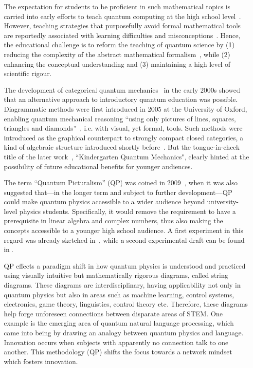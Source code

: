 The expectation for students to be proficient in such mathematical topics is carried into early efforts to teach quantum computing at the high school level~\cite{perry2019quantum}.
However, teaching strategies that purposefully avoid formal mathematical tools are reportedly associated with learning difficulties and misconceptions~\cite{krijtenburg2017insights}.
Hence, the educational challenge is to reform the teaching of quantum science by (1) reducing the complexity of the abstract mathematical formalism~\cite{bouchee2022towards}, while (2) enhancing the conceptual understanding and (3) maintaining a high level of scientific rigour.

The development of categorical quantum mechanics~\cite{abramsky2009categorical} in the early 2000s showed that an alternative approach to introductory quantum education was possible.
Diagrammatic methods were first introduced in 2005 at the University of Oxford, enabling quantum mechanical reasoning ``using only pictures of lines, squares, triangles and diamonds''~\cite{coecke2006kindergarten}, i.e. with visual, yet formal, tools.
Such methods were introduced as the graphical counterpart to strongly compact closed categories, a kind of algebraic structure introduced shortly before~\cite{abramsky2004categorical}.
But the tongue-in-cheek title of the later work~\cite{coecke2006kindergarten}, ``Kindergarten Quantum Mechanics", clearly hinted at the possibility of future educational benefits for younger audiences.

The term ``Quantum Picturalism'' (QP) was coined in 2009~\cite{ContPhys}, when it was also suggested that---in the longer term and subject to further development---QP could make quantum physics accessible to a wider audience beyond university-level physics students. Specifically, it would remove the requirement to have a prerequisite in linear algebra and complex numbers, thus also making the concepts accessible to a younger high school audience. 
A first experiment in this regard was already sketched in~\cite[\S6]{ContPhys}, while a second experimental draft can be found in \cite{exp1}.



QP effects a paradigm shift in how quantum physics is understood and practiced using visually intuitive but mathematically rigorous diagrams, called string diagrams. These diagrams are interdisciplinary, having applicability not only in quantum physics but also in areas such as machine learning, control systems, electronics, game theory, linguistics, control theory etc. Therefore, these diagrams help forge unforeseen connections between disparate areas of STEM. One example is the emerging area of quantum natural language processing, which came into being by drawing an analogy between quantum physics and language.
Innovation occurs when subjects with apparently no connection talk to one another. This methodology (QP) shifts the focus towards a network mindset which fosters innovation.

